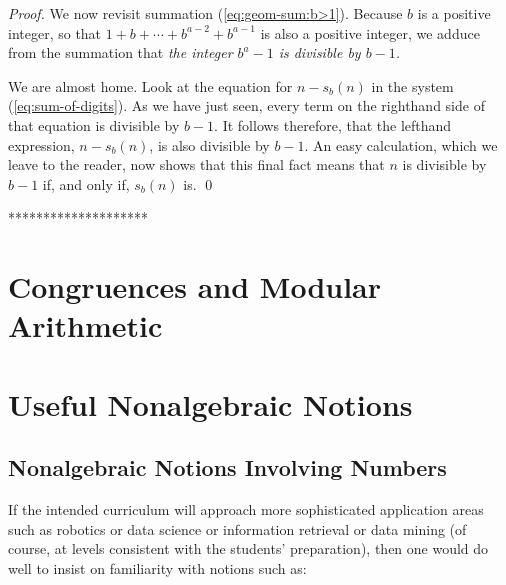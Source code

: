 {\begin{proof}
We now revisit summation (\ref{eq:geom-sum:b>1}).  Because $b$ is a
positive integer, so that $1 + b + \cdots + b^{a-2} + b^{a-1}$ is also
a positive integer, we adduce from the summation that {\em the integer
  $b^a -1$ is divisible by $b-1$.}

We are almost home.  Look at the equation for $n - s_b(n)$ in the
system (\ref{eq:sum-of-digits}).  As we have just seen, every term on
the righthand side of that equation is divisible by $b-1$.  It follows
therefore, that the lefthand expression, $n - s_b(n)$, is also
divisible by $b-1$.  An easy calculation, which we leave to the
reader, now shows that this final fact means that $n$ is divisible by
$b-1$ if, and only if, $s_b(n)$ is.  \qed
\end{proof}
********************}




\section{Congruences and Modular Arithmetic}




\section{Useful Nonalgebraic Notions}
\label{sec:extra-functions}

\subsection{Nonalgebraic Notions Involving Numbers}


If the intended curriculum will approach more sophisticated
application areas such as robotics or data science or information
retrieval or data mining (of course, at levels consistent with the
students' preparation), then one would do well to insist on
familiarity with notions such as:


